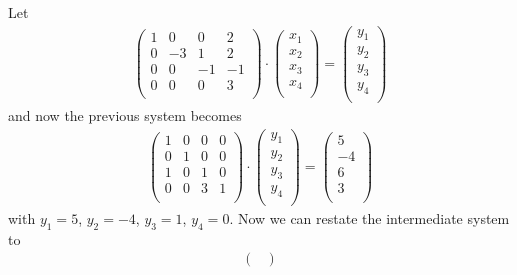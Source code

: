 \documentclass{article}
\begin{document}
\begin{enumerate}
    Let
    \begin{align*}
        \begin{pmatrix}
            1 & 0 & 0 & 2 \\
            0 & -3 & 1 & 2 \\
            0 & 0 & -1 & -1 \\
            0 & 0 & 0 & 3 \\
        \end{pmatrix} \cdot \begin{pmatrix}
            x_1 \\ x_2 \\ x_3 \\ x_4 \\
        \end{pmatrix} = \begin{pmatrix}
            y_1 \\ y_2 \\ y_3 \\ y_4 \\
        \end{pmatrix}
    \end{align*}
    and now the previous system becomes
    \begin{align*}
        \begin{pmatrix}
            1 & 0 & 0 & 0 \\
            0 & 1 & 0 & 0 \\
            1 & 0 & 1 & 0 \\
            0 & 0 & 3 & 1 \\
        \end{pmatrix} \cdot 
        \begin{pmatrix}
            y_1 \\ y_2 \\ y_3 \\ y_4 \\
        \end{pmatrix} =
        \begin{pmatrix}
            5 \\ -4 \\ 6 \\ 3 \\ 
        \end{pmatrix}
    \end{align*}
    with $y_1 = 5$, $y_2 = -4$, $y_3 = 1$, $y_4 = 0$. Now we can restate the intermediate system to
    \begin{align*}
        \begin{pmatrix}

\end{pmatrix}
\end{align*}
\end{enumerate}
\end{document}
